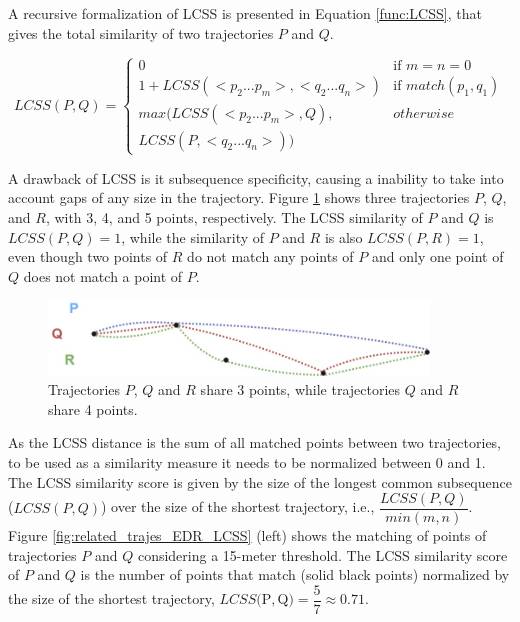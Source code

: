 A recursive formalization of LCSS is presented in Equation \ref{func:LCSS}{, that gives the total similarity of two trajectories $P$ and $Q$}.

\begin{equation}
\label{func:LCSS}
  LCSS(P, Q) = 
  \begin{cases} 
      0 & \text{if } m = n = 0\\ 
      1 + LCSS(<p_2...p_m>,<q_2...q_n>) & \text{if } match(p_1, q_1)\\
      max(LCSS(<p_2...p_m>, Q),  & otherwise \\
      LCSS(P, <q_2...q_n>))
  \end{cases}
\end{equation}

A drawback of LCSS is it subsequence specificity, causing a inability to take into account gaps of any size in the trajectory. Figure \ref{fig:related_trajes_PQR} shows three trajectories $P$, $Q$, and $R$, with 3, 4, and 5 points, respectively. The LCSS similarity of $P$ and $Q$ is $LCSS(P, Q) = 1$, while the similarity of $P$ and $R$ is also $LCSS(P, R) = 1$, even though two points of $R$ do not match any points of $P$ and only one point of $Q$ does not match a point of $P$.


\begin{figure}[h]
\centering
\includegraphics[width=0.9\textwidth]{Related_Works/related_trajes_PQR.jpg}
\caption{\label{fig:related_trajes_PQR}Trajectories $P$, $Q$ and $R$ share 3 points, while trajectories $Q$ and $R$ share 4 points.}
\end{figure}

As the LCSS distance is the sum of all matched points between two trajectories, to be used as a similarity measure it needs to be normalized between 0 and 1. The LCSS similarity score is given by the size of the longest common subsequence ($LCSS(P, Q)$) over the size of the shortest trajectory, i.e., $\dfrac{LCSS(P, Q)}{min(m, n)}$.
Figure \ref{fig:related_trajes_EDR_LCSS} (left) shows the matching of points of trajectories $P$ and $Q$ considering a 15-meter threshold. The LCSS similarity score of $P$ and $Q$ is the {number of points that match} (solid black points) normalized by the size of the shortest trajectory, $LCSS($P$, $Q$) = \dfrac{5}{7} \approx 0.71$.

